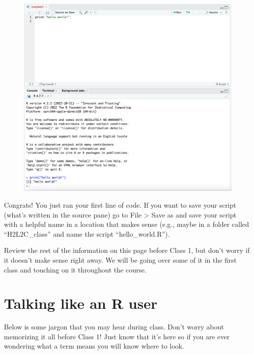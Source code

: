 \documentclass[
  letterpaper,
  DIV=11,
  numbers=noendperiod]{scrreprt}
\begin{document}
\begin{figure}

{\centering \includegraphics{scripts/00_intro/class0_images/Picture5.png}

}

\end{figure}

Congrats! You just ran your first line of code. If you want to save your
script (what's written in the source pane) go to File \textgreater{}
Save as and save your script with a helpful name in a location that
makes sense (e.g., maybe in a folder called ``H2L2C\_class'' and name
the script ``hello\_world.R'').

Review the rest of the information on this page before Class 1, but
don't worry if it doesn't make sense right away. We will be going over
some of it in the first class and touching on it throughout the course.

\hypertarget{talking-like-an-r-user}{%
\section{Talking like an R user}\label{talking-like-an-r-user}}

Below is some jargon that you may hear during class. Don't worry about
memorizing it all before Class 1! Just know that it's here so if you are
ever wondering what a term means you will know where to look.
\end{document}
